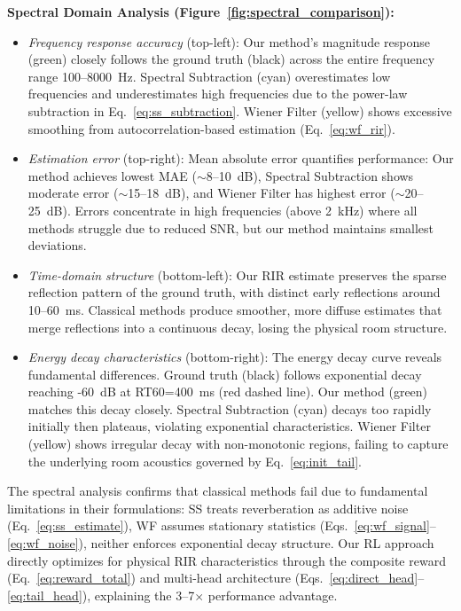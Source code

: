 \documentclass[12pt,a4paper]{article}
\begin{document}
\textbf{Spectral Domain Analysis (Figure~\ref{fig:spectral_comparison}):}
\begin{itemize}
\item \textit{Frequency response accuracy} (top-left): Our method's magnitude response (green) closely follows the ground truth (black) across the entire frequency range 100--8000~Hz. Spectral Subtraction (cyan) overestimates low frequencies and underestimates high frequencies due to the power-law subtraction in Eq.~\eqref{eq:ss_subtraction}. Wiener Filter (yellow) shows excessive smoothing from autocorrelation-based estimation (Eq.~\eqref{eq:wf_rir}).

\item \textit{Estimation error} (top-right): Mean absolute error quantifies performance: Our method achieves lowest MAE ($\sim$8--10~dB), Spectral Subtraction shows moderate error ($\sim$15--18~dB), and Wiener Filter has highest error ($\sim$20--25~dB). Errors concentrate in high frequencies (above 2~kHz) where all methods struggle due to reduced SNR, but our method maintains smallest deviations.

\item \textit{Time-domain structure} (bottom-left): Our RIR estimate preserves the sparse reflection pattern of the ground truth, with distinct early reflections around 10--60~ms. Classical methods produce smoother, more diffuse estimates that merge reflections into a continuous decay, losing the physical room structure.

\item \textit{Energy decay characteristics} (bottom-right): The energy decay curve reveals fundamental differences. Ground truth (black) follows exponential decay reaching -60~dB at RT60=400~ms (red dashed line). Our method (green) matches this decay closely. Spectral Subtraction (cyan) decays too rapidly initially then plateaus, violating exponential characteristics. Wiener Filter (yellow) shows irregular decay with non-monotonic regions, failing to capture the underlying room acoustics governed by Eq.~\eqref{eq:init_tail}.
\end{itemize}

The spectral analysis confirms that classical methods fail due to fundamental limitations in their formulations: SS treats reverberation as additive noise (Eq.~\eqref{eq:ss_estimate}), WF assumes stationary statistics (Eqs.~\eqref{eq:wf_signal}--\eqref{eq:wf_noise}), neither enforces exponential decay structure. Our RL approach directly optimizes for physical RIR characteristics through the composite reward (Eq.~\eqref{eq:reward_total}) and multi-head architecture (Eqs.~\eqref{eq:direct_head}--\eqref{eq:tail_head}), explaining the 3--7$\times$ performance advantage.
\end{document}
